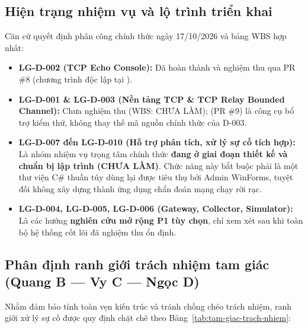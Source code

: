 \documentclass[12pt,a4paper]{article}
\begin{document}
\subsection{Hiện trạng nhiệm vụ và lộ trình triển khai}
Căn cứ quyết định phân công chính thức ngày 17/10/2026 và bảng WBS hợp nhất:
\begin{itemize}
  \item \textbf{LG-D-002 (TCP Echo Console):} Đã hoàn thành và nghiệm thu qua PR \#8 (chương trình độc lập tại ).
  \item \textbf{LG-D-001 \& LG-D-003 (Nền tảng TCP \& TCP Relay Bounded Channel):} Chưa nghiệm thu (WBS: CHƯA LÀM);  (PR \#9) là công cụ bổ trợ kiểm thử, không thay thế mã nguồn chính thức của D-003.
  \item \textbf{LG-D-007 đến LG-D-010 (Hỗ trợ phân tích, xử lý sự cố tích hợp):} Là nhóm nhiệm vụ trọng tâm chính thức \textbf{đang ở giai đoạn thiết kế và chuẩn bị lập trình (CHƯA LÀM)}. Chức năng này bắt buộc phải là một thư viện C\# thuần túy dùng lại được tiêu thụ bởi Admin WinForms, tuyệt đối không xây dựng thành ứng dụng chẩn đoán mạng chạy rời rạc.
  \item \textbf{LG-D-004, LG-D-005, LG-D-006 (Gateway, Collector, Simulator):} Là các hướng \textbf{nghiên cứu mở rộng P1 tùy chọn}, chỉ xem xét sau khi toàn bộ hệ thống cốt lõi đã nghiệm thu ổn định.
\end{itemize}

\subsection{Phân định ranh giới trách nhiệm tam giác (Quang B --- Vy C --- Ngọc D)}
Nhằm đảm bảo tính toàn vẹn kiến trúc và tránh chồng chéo trách nhiệm, ranh giới xử lý sự cố được quy định chặt chẽ theo Bảng~\ref{tab:tam-giac-trach-nhiem}:
\end{document}
